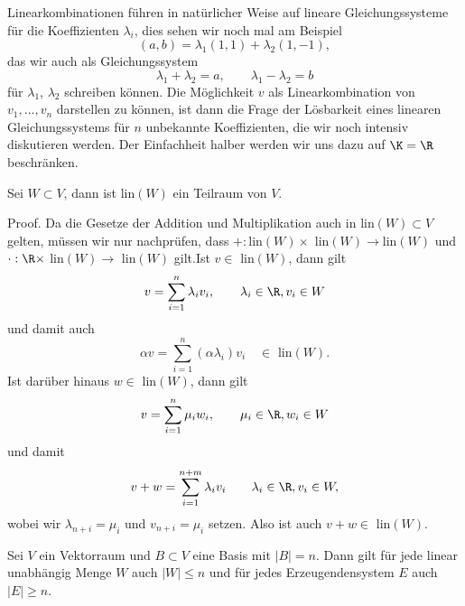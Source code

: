 \documentclass[letterpaper,10pt,english]{jupyterBook}
\begin{document}
Linearkombinationen führen in natürlicher Weise auf lineare Gleichungssysteme für die Koeffizienten \(\lambda_i\), dies sehen wir noch mal am Beispiel
\begin{equation*}
 (a,b) = \lambda_1 (1,1) + \lambda_2 (1,-1),
\end{equation*}
das wir auch  als Gleichungssystem
\begin{equation*}
 \lambda_1 + \lambda_2 = a, \qquad \lambda_1 - \lambda_2 = b
\end{equation*}
für \(\lambda_1\), \(\lambda_2\) schreiben können. Die Möglichkeit \(v\) als Linearkombination von \(v_1, \ldots,v_n\) darstellen zu können, ist dann die Frage der Lösbarkeit eines linearen Gleichungssystems für \(n\) unbekannte Koeffizienten, die wir noch intensiv diskutieren werden. Der Einfachheit halber werden wir uns dazu auf \(\K=\R\) beschränken.
\label{vektorraeume/vektorraeume:theorem-9}
\begin{theorem}{}{}



Sei \(W \subset V\), dann ist lin\((W)\) ein Teilraum von \(V\).
\end{theorem}

\begin{emphBox}{}{}
Proof.  Da die Gesetze der Addition und Multiplikation auch in lin\((W) \subset V\) gelten, müssen wir nur nachprüfen, dass \(+:\)lin\((W) \times\) lin\((W) \rightarrow \)lin\((W)\) und \(\cdot:\R \times\) lin\((W) \rightarrow\) lin\((W)\) gilt.Ist \(v \in \) lin\((W)\), dann gilt
\begin{equation*}
 v = \sum_{i=1}^n \lambda_i v_i, \qquad \lambda_i \in \R, v_i \in W
\end{equation*}
und
damit auch
\begin{equation*}
 \alpha v = \sum_{i=1}^n (\alpha \lambda_i) v_i \quad \in \text{ lin}(W).
\end{equation*}
Ist darüber hinaus \(w \in \) lin\((W)\), dann gilt
\begin{equation*}
 v = \sum_{i=1}^n \mu_i w_i, \qquad \mu_i \in \R, w_i \in W
\end{equation*}
und
damit
\begin{equation*}
 v+ w = \sum_{i=1}^{n+m} \lambda_i v_i \qquad \lambda_i \in \R, v_i \in W,
\end{equation*}
wobei wir \(\lambda_{n+i} = \mu_i\) und \(v_{n+i} = \mu_i\) setzen. Also ist auch \(v+w \in \) lin\((W)\).
\end{emphBox}
\label{vektorraeume/vektorraeume:theorem-10}
\begin{theorem}{}{}



Sei \(V\) ein Vektorraum und \(B \subset V\) eine Basis mit \(|B|=n\). Dann gilt für jede linear unabhängig Menge \(W\) auch \(|W| \leq n\) und für jedes Erzeugendensystem \(E\) auch \(|E| \geq n\).
\end{theorem}
\end{document}
